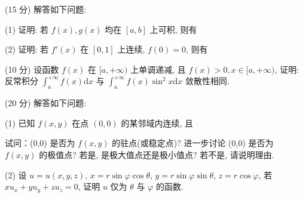 \par{}
(15 分) 解答如下问题:\par
\par{}
(1) 证明: 若 $f(x), g(x)$ 均在 $[a, b]$ 上可积, 则有\par
\nopagebreak[4]
\par{}
(2) 证明: 若 $f'(x)$ 在 $[0,1]$ 上连续, $f(0) = 0$, 则有\par
\nopagebreak[4]
\par{}
(10 分) 设函数 $f(x)$ 在 $[a, +\infty)$ 上单调递减, 且 $f(x) > 0, x \in [a, +\infty)$, 证明: 反常积分 $\int_{a}^{+\infty} f(x) \mathrm{d}x$ 与 $\int_{a}^{+\infty} f(x) \sin^2 x \mathrm{d}x$ 敛散性相同.\par
\par{}
(20 分) 解答如下问题:\par
\par{}
(1) 已知 $f(x, y)$ 在点 $(0, 0)$ 的某邻域内连续, 且\par
\nopagebreak[4]
试问：(0,0) 是否为 $f(x,y)$ 的驻点(或稳定点)? 进一步讨论 (0,0) 是否为 $f(x,y)$ 的极值点? 若是, 是极大值点还是极小值点? 若不是, 请说明理由.\par
(2) 设 $u = u(x, y, z)$, $x = r \sin \varphi \cos \theta$, $y = r \sin \varphi \sin \theta$, $z = r \cos \varphi$, 若 $x u_{x} + y u_{y} + z u_{z} = 0$, 证明 $u$ 仅为 $\theta$ 与 $\varphi$ 的函数.\par
